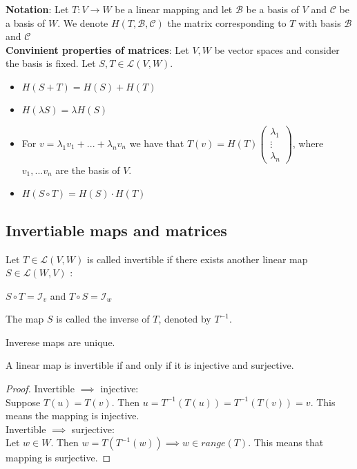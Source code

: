 \textbf{Notation}: Let $T : V \rightarrow W$ be a linear mapping and let $\mathcal{B}$ be a basis of $V$ and $\mathcal{C}$ be a basis of $W$. We denote $H(T, \mathcal{B}, \mathcal{C})$ the matrix corresponding to $T$ with basis $\mathcal{B}$ and $\mathcal{C}$ \\

\textbf{Convinient properties of matrices}: Let $V, W$ be vector spaces and consider the basis is fixed. Let $S, T \in \mathcal{L}(V, W)$. 

\begin{itemize}
	\item $H(S+T) = H(S) + H(T)$
	\item $H(\lambda S) = \lambda H(S)$
	\item For $v = \lambda_1 v_1 + ... + \lambda_n v_n$ we have that $T(v) =   H(T) \begin{pmatrix}
	\lambda_1 \\
	\vdots \\
	\lambda_n
	\end{pmatrix}$, where $v_1,...v_n$ are the basis of $V$.
	\item $H(S \circ T) = H(S) \cdot  H(T)$
\end{itemize}

\subsection{Invertiable maps and matrices}

\begin{definition}
	Let $T \in \mathcal{L}(V,W)$ is called invertible if there exists another linear map $S \in \mathcal{L}(W,V)$ :
	\begin{center}
			$S \circ T = \mathcal{I}_v$ and $T \circ S = \mathcal{I}_w$
	\end{center}
\end{definition}
The map $S$ is called the inverse of $T$, denoted by $T^{-1}$. 

\begin{proposition}
	Inverese maps are unique.
\end{proposition}

\begin{proposition}
	A linear map is invertible if and only if it is injective and surjective.
\end{proposition}

\begin{proof}
	Invertible $\implies$ injective: \\
	Suppose $T(u) = T(v)$. Then $u = T^{-1}(T(u)) = T^{-1}(T(v)) = v$. This means the mapping is injective. \\
	Invertible $\implies$ surjective: \\
	Let $w \in W$. Then $w = T(T^{-1}(w)) \implies w \in range(T)$. This means that mapping is surjective. 
	
\end{proof}

